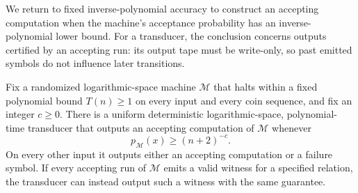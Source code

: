 We return to fixed inverse-polynomial accuracy to construct an accepting
computation when the machine's acceptance probability has an
inverse-polynomial lower bound.
For a transducer, the conclusion concerns outputs certified by an
accepting run: its output tape must be write-only, so past emitted
symbols do not influence later transitions.

\begin{corollary}
\label{cor:certified-search}
Fix a randomized logarithmic-space machine $\mathcal M$ that halts
within a fixed polynomial bound $T(n)\ge1$ on every input and every
coin sequence, and fix an integer $c\ge0$. There is a uniform
deterministic logarithmic-space, polynomial-time transducer that
outputs an accepting computation of $\mathcal M$ whenever
\[
 p_{\mathcal M}(x)\ge(n+2)^{-c}.
\]
On every other input it outputs either an accepting computation or
a failure symbol. If every accepting run of $\mathcal M$ emits a
valid witness for a specified relation, the transducer can instead
output such a witness with the same guarantee.
\end{corollary}

